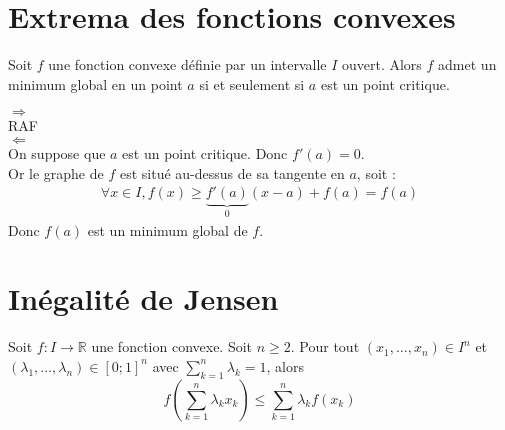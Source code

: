 \documentclass[../main.tex]{subfiles}
\begin{document}
\section{Extrema des fonctions convexes}
\begin{tcolorbox}[title=Propostion 19.20, title filled=false, colframe=lightblue, colback=lightblue!10!white]
    Soit $f$ une fonction convexe définie par un intervalle $I$ ouvert. Alors $f$ admet un minimum global en un point $a$ si et seulement si $a$ est un point critique. 
\end{tcolorbox}

$\boxed{\Rightarrow}$ \\
RAF \\

$\boxed{\Leftarrow}$ \\
On suppose que $a$ est un point critique. Donc $f'(a) = 0$. \\
Or le graphe de $f$ est situé au-dessus de sa tangente en $a$, soit : 
\begin{align*}
    \forall x \in I, f(x) \geq \underbrace{f'(a)}_{0}(x-a) + f(a) = f(a)
\end{align*}
Donc $f(a)$ est un minimum global de $f$.

\section{Inégalité de Jensen}
\begin{tcolorbox}[title=Théorème 19.24, title filled=false, colframe=orange, colback=orange!10!white]
    Soit $f:I\to \mathbb{R}$ une fonction convexe. Soit $n\geq 2$. Pour tout $(x_1, \ldots, x_n) \in I^n$ et $(\lambda_1, \ldots, \lambda_n) \in [0; 1]^n$ avec $\sum\limits_{k=1}^{n} \lambda_k = 1$, alors
    $$f \left( \sum_{k=1}^{n} \lambda_k x_k \right) \leq \sum_{k=1}^{n} \lambda_k f(x_k)$$
\end{tcolorbox}
\end{document}

